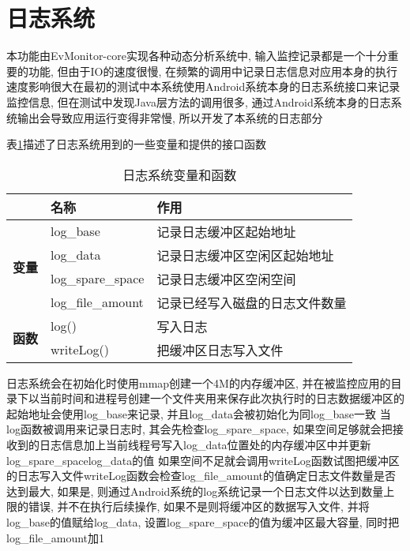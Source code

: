 \section{日志系统}
本功能由EvMonitor-core实现\juhao 各种动态分析系统中, 输入监控记录都是一个十分重要的功能, 但由于IO的速度很慢, 在频繁的调用中记录日志信息对应用本身的执行速度影响很大\juhao 在最初的测试中本系统使用Android系统本身的日志系统接口来记录监控信息, 但在测试中发现Java层方法的调用很多, 通过Android系统本身的日志系统输出会导致应用运行变得非常慢, 所以开发了本系统的日志部分\juhao 

表\ref{logValue}描述了日志系统用到的一些变量和提供的接口函数\juhao 
\begin{table}[ht]
	\centering
	\caption{日志系统变量和函数}
	\begin{tabular}{cll}
		\hline
		\multicolumn{1}{l}{}                             & \textbf{名称}       & \textbf{作用}     \\ \hline
		\multirow{4}{*}{\textbf{变量}}                     & log\_base         & 记录日志缓冲区起始地址     \\
		& log\_data         & 记录日志缓冲区空闲区起始地址  \\
		& log\_spare\_space & 记录日志缓冲区空闲空间     \\
		& log\_file\_amount & 记录已经写入磁盘的日志文件数量 \\ \hline
		\multicolumn{1}{l}{\multirow{2}{*}{\textbf{函数}}} & log()             & 写入日志            \\
		\multicolumn{1}{l}{}                             & writeLog()        & 把缓冲区日志写入文件      \\ \hline
	\end{tabular}
\label{logValue}
\end{table}
日志系统会在初始化时使用mmap创建一个4M的内存缓冲区, 并在被监控应用的目录下以当前时间和进程号创建一个文件夹用来保存此次执行时的日志数据\juhao 缓冲区的起始地址会使用log\_base来记录, 并且log\_data会被初始化为同log\_base一致\juhao 
当log函数被调用来记录日志时, 其会先检查log\_spare\_space, 如果空间足够就会把接收到的日志信息加上当前线程号写入log\_data位置处的内存缓冲区中并更新log\_spare\_space\dunhao log\_data的值 \juhao 如果空间不足就会调用writeLog函数试图把缓冲区的日志写入文件\juhao writeLog函数会检查log\_file\_amount的值确定日志文件数量是否达到最大, 如果是, 则通过Android系统的log系统记录一个日志文件以达到数量上限的错误, 并不在执行后续操作, 如果不是则将缓冲区的数据写入文件, 并将log\_base的值赋给log\_data, 设置log\_spare\_space的值为缓冲区最大容量, 同时把log\_file\_amount加1\juhao 

